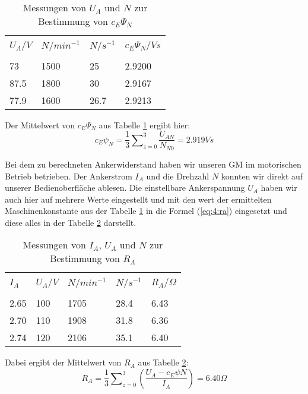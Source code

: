 \begin{table}[h]
	\centering
	\begin{tabular}{p{1.5cm} p{1.5cm} p{1.5cm} | p{1.5cm}}
		&&&\\[-1em]
		$ U_{A}/V $ & $ N/min^{-1} $ & $ N/s^{-1} $ &  $ c_{E}\Psi_{N}/Vs $\\
		\hline &&&\\[-1em]
		73 & 1500 & 25 & 2.9200 \\
		87.5 & 1800 & 30 & 2.9167 \\
		77.9 & 1600 & 26.7 & 2.9213
	\end{tabular}
	\caption{Messungen von $ U_{A} $ und $ N $ zur Bestimmung von $ c_{E}\Psi_{N} $}
	\label{tab:4b:cepsi}
\end{table}
Der Mittelwert von $ c_{E}\Psi_{N} $ aus Tabelle \ref{tab:4b:cepsi} ergibt hier:
\begin{equation}
	c_{E}\psi_{N} = \frac{1}{3} \sum\nolimits_{z=0}^3 \frac{U_{AN}}{N_{N0}} = 2.919Vs
\end{equation}

Bei dem zu berechneten Ankerwiderstand haben wir unseren GM im motorischen Betrieb betrieben. Der Ankerstrom $ I_{A} $ und die Drehzahl $ N $ konnten wir direkt auf unserer Bedienoberfläche ablesen. Die einstellbare Ankerspannung $ U_{A} $ haben wir auch hier auf mehrere Werte eingestellt und mit den wert der ermittelten Maschinenkonstante aus der Tabelle \ref{tab:4b:cepsi} in die Formel (\ref{eq:4:ra}) eingesetzt und diese alles in der Tabelle \ref{tab:4b:ra} darstellt.
\begin{table}[h]
	\centering
	\begin{tabular}{p{1.5cm} p{1.5cm} p{1.5cm} p{1.5cm} | p{1.5cm}}
		&&&&\\[-1em]
		$ I_{A} $ & $ U_{A}/V $ & $ N/min^{-1} $ & $ N/s^{-1} $ &  $ R_{A}/\Omega $\\
		\hline &&&&\\[-1em]
		2.65 & 100 & 1705 & 28.4 & 6.43 \\
		2.70 & 110 & 1908 & 31.8 & 6.36 \\
		2.74 & 120 & 2106 & 35.1 & 6.40
	\end{tabular}
	\caption{Messungen von $ I_{A} $, $ U_{A} $ und $ N $ zur Bestimmung von $ R_{A} $}
	\label{tab:4b:ra}
\end{table}
Dabei ergibt der Mittelwert von $ R_{A} $ aus Tabelle \ref{tab:4b:ra}:
\begin{equation}
	R_{A} = \frac{1}{3} \sum\nolimits_{z=0}^3 \left(\frac{U_{A} - c_{E}\psi N}{I_{A}}\right) = 6.40\Omega
\end{equation}

